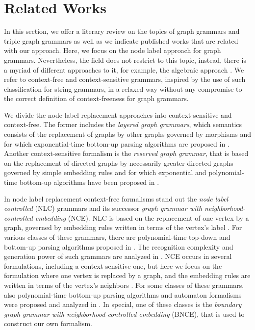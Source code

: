 \documentclass[runningheads]{llncs}
\begin{document}
\section{Related Works}
\label{sec:rw}
In this section, we offer a literary review on the topics of graph grammars and triple graph grammars as well as we indicate published works that are related with our approach. Here, we focus on the node label approach for graph grammars. Nevertheless, the field does not restrict to this topic, instead, there is a myriad of different approaches to it, for example, the algebraic approach \cite{ehrig1999handbook}. We refer to context-free and context-sensitive grammars, inspired by the use of such classification for string grammars, in a relaxed way without any compromise to the correct definition of context-freeness for graph grammars.

We divide the node label replacement approaches into context-sensitive and context-free. The former includes the \textit{layered graph grammars}, which semantics consists of the replacement of graphs by other graphs governed by morphisms \cite{rekers1997defining} and for which exponential-time bottom-up parsing algorithms are proposed in \cite{rekers1995graph,bottoni2000efficient,furst2011improving}. Another context-sensitive formalism is the \textit{reserved graph grammar}, that is based on the replacement of directed graphs by necessarily greater directed graphs governed by simple embedding rules \cite{zhang2001context} and for which exponential and polynomial-time bottom-up algorithms have been proposed in \cite{zeng2005rgg+,zou2017partial}.

In node label replacement context-free formalisms stand out the \textit{node label controlled} (NLC) grammars and its successor \textit{graph grammar with neighborhood-controlled embedding} (NCE). NLC is based on the replacement of one vertex by a graph, governed by embedding rules written in terms of the vertex's label \cite{rozenberg1986boundary}. For various classes of these grammars, there are polynomial-time top-down and bottom-up parsing algorithms proposed in \cite{flasinski1993parsing,flasinski2014characteristics,rozenberg1986boundary,wanke1991algorithms}. The recognition complexity and generation power of such grammars are analyzed in \cite{flasinski1998power,kim2012structure}. NCE occurs in several formulations, including a context-sensitive one, but here we focus on the formulation where one vertex is replaced by a graph, and the embedding rules are written in terms of the vertex's neighbors \cite{janssens1982graph,skodinis1998neighborhood}. For some classes of these grammars, also polynomial-time bottom-up parsing algorithms and automaton formalisms were proposed and analyzed in \cite{kim2001efficient,brandenburg2005finite}. In special, one of these classes is the \textit{boundary graph grammar with neighborhood-controlled embedding} (BNCE), that is used to construct our own formalism.
\end{document}
